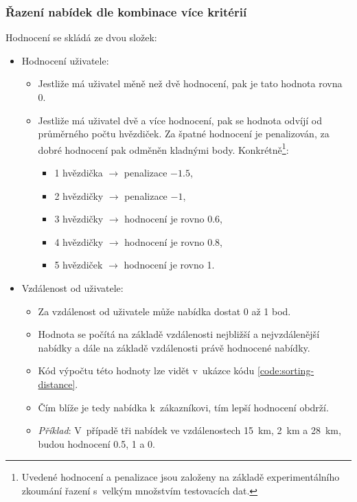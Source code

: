\subsubsection{Řazení nabídek dle kombinace více kritérií}
Hodnocení se skládá ze dvou složek:
\begin{itemize}
	\item Hodnocení uživatele:
        \begin{itemize}
            \item Jestliže má uživatel měně než dvě hodnocení, pak je tato hodnota rovna 0.
            \item Jestliže má uživatel dvě a více hodnocení, pak se hodnota odvíjí od průměrného počtu hvězdiček. Za špatné hodnocení je penalizován, za dobré hodnocení pak odměněn kladnými body. Konkrétně\footnote{Uvedené hodnocení a penalizace jsou založeny na základě experimentálního zkoumání řazení s~velkým množstvím testovacích dat.}:
            \begin{itemize}
                \item 1 hvězdička $\rightarrow$ penalizace $-1.5$,
                \item 2 hvězdičky $\rightarrow$ penalizace $-1$,
                \item 3 hvězdičky $\rightarrow$ hodnocení je rovno 0.6,
                \item 4 hvězdičky $\rightarrow$ hodnocení je rovno 0.8,
                \item 5 hvězdiček $\rightarrow$ hodnocení je rovno 1.
            \end{itemize}
        \end{itemize}
	\item Vzdálenost od uživatele:
        \begin{itemize}
            \item Za vzdálenost od uživatele může nabídka dostat 0 až 1 bod.
            \item Hodnota se počítá na základě vzdálenosti nejbližší a nejvzdálenější nabídky a dále na základě vzdálenosti právě hodnocené nabídky.
            \item Kód výpočtu této hodnoty lze vidět v~ukázce kódu \ref{code:sorting-distance}.
            \item Čím blíže je tedy nabídka k~zákazníkovi, tím lepší hodnocení obdrží.
            \item \textit{Příklad}: V~případě tři nabídek ve vzdálenostech 15~km, 2~km a 28~km, budou hodnocení 0.5, 1 a 0.
        \end{itemize}
\end{itemize}

